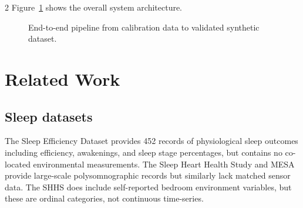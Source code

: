 \documentclass[11pt,a4paper]{article}
\begin{document}
\begin{multicols}{2}
Figure~\ref{fig:pipeline} shows the overall system architecture.

\begin{figure}[t]
  \centering
  \caption{End-to-end pipeline from calibration data to validated synthetic dataset.}
  \label{fig:pipeline}
\end{figure}

\section{Related Work}

\subsection{Sleep datasets}
The Sleep Efficiency Dataset \cite{kaggle_sleep_efficiency} provides 452
records of physiological sleep outcomes including efficiency, awakenings, and
sleep stage percentages, but contains no co-located environmental measurements.
The Sleep Heart Health Study \cite{quan1997sleep} and MESA \cite{chen2015racial}
provide large-scale polysomnographic records but similarly lack matched sensor
data.  The SHHS \cite{quan1997sleep} does include self-reported bedroom
environment variables, but these are ordinal categories, not continuous
time-series.


\end{multicols}
\end{document}
